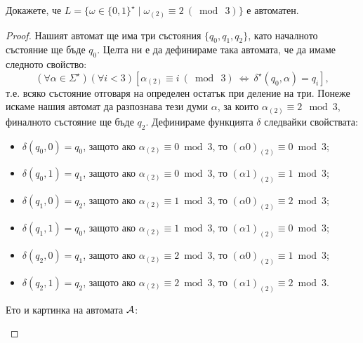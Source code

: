 \begin{problem}
  Докажете, че $L = \{\omega \in \{0,1\}^\star \mid \omega_{(2)} \equiv 2\ (\bmod\ 3)\}$ е автоматен.
\end{problem}
\begin{proof}
  Нашият автомат ще има три състояния $\{q_0,q_1,q_2\}$, като началното състояние ще бъде $q_0$.
  Целта ни е да дефинираме така автомата, че да имаме следното свойство:
  \begin{equation}
    (\forall\alpha\in\Sigma^\star)(\forall i < 3)[\alpha_{(2)} \equiv i\ (\bmod\ 3)\ \Leftrightarrow\ \delta^\star(q_0,\alpha) = q_i],
  \end{equation}
  т.е. всяко състояние отговаря на определен остатък при деление на три.
  Понеже искаме нашия автомат да разпознава тези думи $\alpha$,
  за които $\alpha_{(2)} \equiv 2\mod 3$, финалното състояние ще бъде $q_2$.
  Дефинираме функцията $\delta$ следвайки свойствата:
  \begin{itemize}
  \item
    $\delta(q_0,0) = q_0$, защото ако $\alpha_{(2)} \equiv 0 \bmod 3$, то $(\alpha0)_{(2)} \equiv 0 \bmod 3$;
  \item 
    $\delta(q_0,1) = q_1$, защото ако $\alpha_{(2)} \equiv 0 \bmod 3$, то $(\alpha1)_{(2)} \equiv 1 \bmod 3$;
  \item
    $\delta(q_1,0) = q_2$, защото ако $\alpha_{(2)} \equiv 1 \bmod 3$, то $(\alpha0)_{(2)} \equiv 2 \bmod 3$;
  \item 
    $\delta(q_1,1) = q_0$, защото ако $\alpha_{(2)} \equiv 1 \bmod 3$, то $(\alpha1)_{(2)} \equiv 0 \bmod 3$;
  \item
    $\delta(q_2,0) = q_1$, защото ако $\alpha_{(2)} \equiv 2 \bmod 3$, то $(\alpha0)_{(2)} \equiv 1 \bmod 3$;
  \item 
    $\delta(q_2,1) = q_2$, защото ако $\alpha_{(2)} \equiv 2 \bmod 3$, то $(\alpha1)_{(2)} \equiv 2 \bmod 3$.
  \end{itemize}
  Ето и картинка на автомата $\mathcal{A}$:
  \begin{framed}
  \begin{figure}[H]
    \begin{center}
\end{center}
\end{figure}
\end{framed}
\end{proof}
